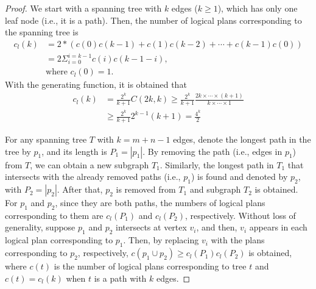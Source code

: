 \begin{proof}
    We start with a spanning tree with $k$ edges ($k \geq 1$), which has only one leaf node (i.e., it is a path).
    Then, the number of logical plans corresponding to the spanning tree is
    \begin{equation*}
        \begin{split}
            c_l(k) & = 2 * (c(0)c(k-1) + c(1)c(k-2) + \cdots + c(k-1)c(0)) \\
            & = 2\Sigma_{i=0}^{i=k-1}c(i)c(k-1-i), \\
            & \text{where } c_l(0) = 1.
        \end{split}
    \end{equation*}
    With the generating function, it is obtained that 
    \begin{equation*}
        \begin{split}
            c_l(k) & = \frac{2^k}{k+1}C(2k, k) \geq \frac{2^k}{k+1}\frac{2k \times \cdots \times (k+1)}{k \times \cdots \times 1} \\
            & \geq \frac{2^k}{k+1}2^{k-1}(k+1) = \frac{4^k}{2}
        \end{split}
    \end{equation*}

    For any spanning tree $T$ with $k = m + n - 1$ edges, denote the longest path in the tree by $p_1$, and its length is $P_1 = |p_1|$.
    By removing the path (i.e., edges in $p_1$) from $T$, we can obtain a new subgraph $T_1$.
    Similarly, the longest path in $T_1$ that intersects with the already removed paths (i.e., $p_1$) is found and denoted by $p_2$, with $P_2 = |p_2|$.
    After that, $p_2$ is removed from $T_1$ and subgraph $T_2$ is obtained.
    For $p_1$ and $p_2$, since they are both paths, the numbers of logical plans corresponding to them are $c_l(P_1)$ and $c_l(P_2)$, respectively.
    Without loss of generality, suppose $p_1$ and $p_2$ intersects at vertex $v_i$, and then, $v_i$ appears in each logical plan corresponding to $p_1$.
    Then, by replacing $v_i$ with the plans corresponding to $p_2$, respectively, $c(p_1 \cup p_2) \geq c_l(P_1)c_l(P_2)$ is obtained, where $c(t)$ is the number of logical plans corresponding to tree $t$ and $c(t) = c_l(k)$ when $t$ is a path with $k$ edges.


\end{proof}
